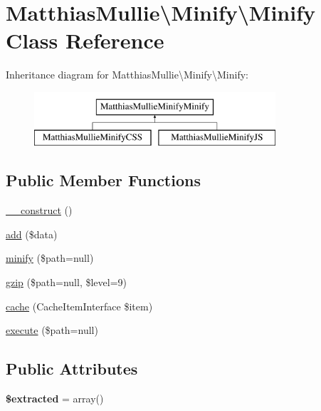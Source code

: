 \hypertarget{classMatthiasMullie_1_1Minify_1_1Minify}{}\section{Matthias\+Mullie\textbackslash{}Minify\textbackslash{}Minify Class Reference}
\label{classMatthiasMullie_1_1Minify_1_1Minify}
Inheritance diagram for Matthias\+Mullie\textbackslash{}Minify\textbackslash{}Minify\+:\begin{figure}[H]
\begin{center}
\leavevmode
\includegraphics[height=2.000000cm]{classMatthiasMullie_1_1Minify_1_1Minify}
\end{center}
\end{figure}
\subsection*{Public Member Functions}
\begin{DoxyCompactItemize}
\item 
\hyperlink{classMatthiasMullie_1_1Minify_1_1Minify_ae5ea3b458c35497dc4ff966cee267437}{\+\_\+\+\_\+construct} ()
\item 
\hyperlink{classMatthiasMullie_1_1Minify_1_1Minify_a33743c6d8907da38b20d48df3fe89bc2}{add} (\$data)
\item 
\hyperlink{classMatthiasMullie_1_1Minify_1_1Minify_aaf66e57619d917438dc576e50adbc0a0}{minify} (\$path=null)
\item 
\hyperlink{classMatthiasMullie_1_1Minify_1_1Minify_a2dfa9a1f5f4dd2a3db440c921d846f9f}{gzip} (\$path=null, \$level=9)
\item 
\hyperlink{classMatthiasMullie_1_1Minify_1_1Minify_a2dc0d25b11384ca1678e7ac303fc8e2c}{cache} (Cache\+Item\+Interface \$item)
\item 
\hyperlink{classMatthiasMullie_1_1Minify_1_1Minify_a78089618b3f87b80fc98dc00bed21de9}{execute} (\$path=null)
\end{DoxyCompactItemize}
\subsection*{Public Attributes}
\begin{DoxyCompactItemize}
\item 
{\bfseries \$extracted} = array()\hypertarget{classMatthiasMullie_1_1Minify_1_1Minify_a908a08db992158e800aa31a304ce78e8}{}\label{classMatthiasMullie_1_1Minify_1_1Minify_a908a08db992158e800aa31a304ce78e8}

\end{DoxyCompactItemize}
